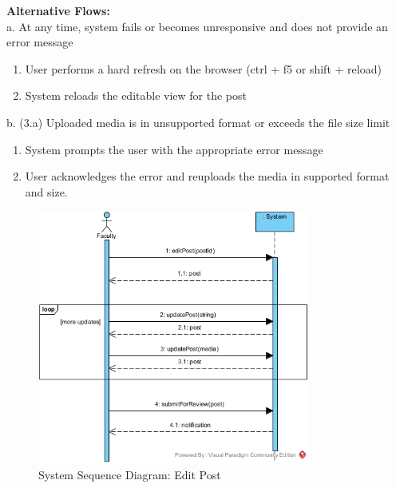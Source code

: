 \documentclass{article}
\begin{document}
\textbf{Alternative Flows:}  \\
a. At any time, system fails or becomes unresponsive and does not provide an error message
\begin{enumerate}
    \item User performs a hard refresh on the browser (ctrl + f5 or shift + reload)
    \item System reloads the editable view for the post
\end{enumerate}
b. (3.a) Uploaded media is in unsupported format or exceeds the file size limit
\begin{enumerate}
    \item System prompts the user with the appropriate error message
    \item User acknowledges the error and reuploads the media in supported format and size.
\end{enumerate}

\begin{figure}[H]
    \centering
    \includegraphics[width=0.8\textwidth]{images/SSD-UC11-EditPost.png}
    \centering
    \caption{System Sequence Diagram: Edit Post}
\end{figure}
\end{document}

